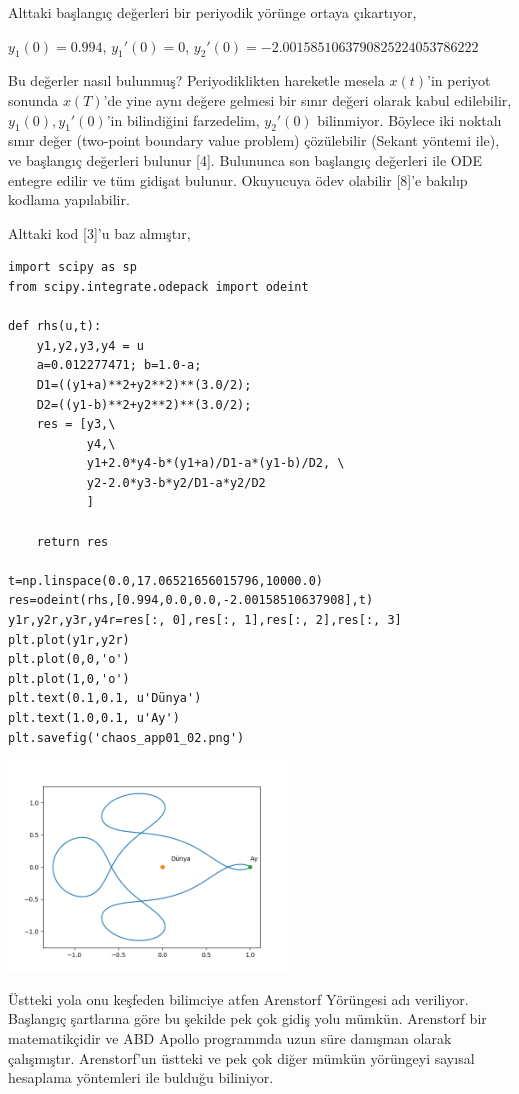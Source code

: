 \documentclass[12pt,fleqn]{article}\usepackage{../../common}
\begin{document}
Alttaki başlangıç değerleri bir periyodik yörünge ortaya çıkartıyor,

$y_1(0) = 0.994$, $y_1'(0)=0$, $y_2'(0) = -2.0015851063790825224053786222$

Bu değerler nasıl bulunmuş? Periyodiklikten hareketle mesela $x(t)$'in
periyot sonunda $x(T)$'de yine aynı değere gelmesi bir sınır değeri olarak
kabul edilebilir, $y_1(0),y_1'(0)$'in bilindiğini farzedelim, $y_2'(0)$
bilinmiyor. Böylece iki noktalı sınır değer (two-point boundary value
problem) çözülebilir (Sekant yöntemi ile), ve başlangıç değerleri bulunur
[4]. Bulununca son başlangıç değerleri ile ODE entegre edilir ve tüm
gidişat bulunur. Okuyucuya ödev olabilir [8]'e bakılıp kodlama yapılabilir.

Alttaki kod [3]'u baz almıştır, 

\begin{verbatim}
import scipy as sp
from scipy.integrate.odepack import odeint

def rhs(u,t):
    y1,y2,y3,y4 = u
    a=0.012277471; b=1.0-a;    
    D1=((y1+a)**2+y2**2)**(3.0/2);
    D2=((y1-b)**2+y2**2)**(3.0/2);
    res = [y3,\
           y4,\
           y1+2.0*y4-b*(y1+a)/D1-a*(y1-b)/D2, \
           y2-2.0*y3-b*y2/D1-a*y2/D2
           ]

    return res

t=np.linspace(0.0,17.06521656015796,10000.0)
res=odeint(rhs,[0.994,0.0,0.0,-2.00158510637908],t)
y1r,y2r,y3r,y4r=res[:, 0],res[:, 1],res[:, 2],res[:, 3]
plt.plot(y1r,y2r)
plt.plot(0,0,'o')
plt.plot(1,0,'o')
plt.text(0.1,0.1, u'Dünya')
plt.text(1.0,0.1, u'Ay')
plt.savefig('chaos_app01_02.png')
\end{verbatim}

\includegraphics[width=20em]{chaos_app01_02.png}

Üstteki yola onu keşfeden bilimciye atfen Arenstorf Yörüngesi adı
veriliyor. Başlangıç şartlarına göre bu şekilde pek çok gidiş yolu
mümkün. Arenstorf bir matematikçidir ve ABD Apollo programında uzun süre
danışman olarak çalışmıştır. Arenstorf'un üstteki ve pek çok diğer mümkün
yörüngeyi sayısal hesaplama yöntemleri ile bulduğu biliniyor.
\end{document}
